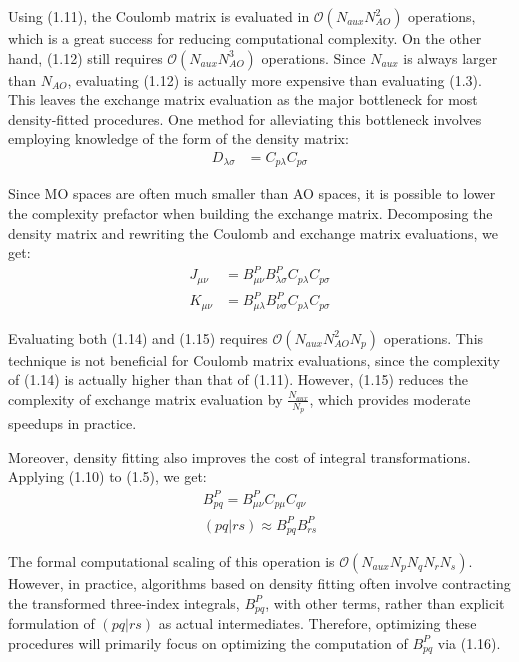\noindent Using (1.11), the Coulomb matrix is evaluated in $\mathcal{O}(N_{aux}N_{AO}^2)$ operations, which is a great success
for reducing computational complexity. On the other hand, (1.12) still requires $\mathcal{O}(N_{aux}N_{AO}^3)$ operations. 
Since $N_{aux}$ is always larger than $N_{AO}$, evaluating (1.12) is actually more expensive than evaluating (1.3).
This leaves the exchange matrix evaluation as the major bottleneck for most density-fitted procedures.
One method for alleviating this bottleneck involves employing knowledge 
of the form of the density matrix:
\begin{align}
D_{\lambda \sigma} &= C_{p\lambda}C_{p\sigma} 
\end{align}

\noindent Since MO spaces are often much smaller than AO spaces, it is possible to lower the complexity prefactor when 
building the exchange matrix. 
Decomposing the density matrix and rewriting the Coulomb and exchange matrix evaluations, we get:
\begin{align}
J_{\mu \nu} &= B_{\mu \nu}^P B_{\lambda \sigma}^PC_{p\lambda}C_{p\sigma} \\
K_{\mu \nu} &= B_{\mu \lambda}^P B_{\nu \sigma}^PC_{p\lambda}C_{p\sigma}
\end{align}

\noindent Evaluating both (1.14) and (1.15) requires $\mathcal{O}(N_{aux}N_{AO}^2N_p)$ operations.
This technique is not beneficial for Coulomb matrix evaluations, since the complexity of (1.14) is actually
higher than that of (1.11). However, (1.15) reduces the complexity of exchange matrix evaluation by  
$\frac{N_{aux}}{N_p}$, which provides moderate speedups in practice.

Moreover, density fitting also improves the cost of integral transformations. Applying (1.10) to (1.5), we get:
\begin{align}
B^P_{pq} = B^P_{\mu \nu}C_{p \mu}C_{q \nu} \\
(pq | rs) \approx B^P_{pq}B^P_{rs}
\end{align}

\noindent The formal computational scaling of this operation is $\mathcal{O}(N_{aux}N_pN_qN_rN_s)$. However, in practice,
algorithms based on density fitting often involve contracting the transformed three-index integrals, $B^P_{pq}$, with other terms, 
rather than explicit formulation of $(pq|rs)$ as actual intermediates. Therefore, optimizing these procedures will primarily
focus on optimizing the computation of $B^P_{pq}$ via (1.16). 

